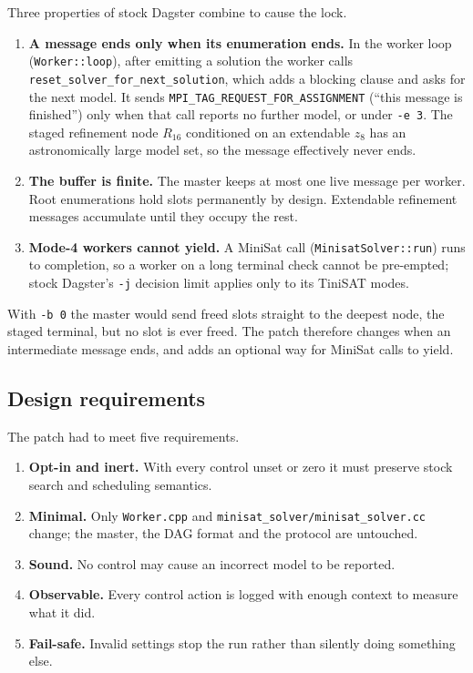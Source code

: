 \documentclass[11pt,a4paper]{article}
\newcommand{\flag}[1]{\texttt{#1}}
\begin{document}
Three properties of stock Dagster combine to cause the lock.
\begin{enumerate}
\item \textbf{A message ends only when its enumeration ends.} In the worker loop
(\texttt{Worker::loop}), after emitting a solution the worker calls
\texttt{reset\_solver\_for\_next\_solution}, which adds a blocking clause and asks for the next model.
It sends \texttt{MPI\_TAG\_REQUEST\_FOR\_ASSIGNMENT} (``this message is finished'') only when that
call reports no further model, or under \flag{-e 3}. The staged refinement node $R_{16}$ conditioned
on an extendable $z_8$ has an astronomically large model set, so the message effectively never ends.
\item \textbf{The buffer is finite.} The master keeps at most one live message per worker. Root
enumerations hold slots permanently by design. Extendable refinement messages accumulate until they
occupy the rest.
\item \textbf{Mode-4 workers cannot yield.} A MiniSat call (\texttt{MinisatSolver::run}) runs to
completion, so a worker on a long terminal check cannot be pre-empted; stock Dagster's \flag{-j}
decision limit applies only to its TiniSAT modes.
\end{enumerate}
With \flag{-b 0} the master would send freed slots straight to the deepest node, the staged terminal,
but no slot is ever freed. The patch therefore changes when an intermediate message ends, and adds an
optional way for MiniSat calls to yield.

\subsection{Design requirements}

The patch had to meet five requirements.
\begin{enumerate}
\item \textbf{Opt-in and inert.} With every control unset or zero it must preserve stock search and
scheduling semantics.
\item \textbf{Minimal.} Only \texttt{Worker.cpp} and \texttt{minisat\_solver/minisat\_solver.cc}
change; the master, the DAG format and the protocol are untouched.
\item \textbf{Sound.} No control may cause an incorrect model to be reported.
\item \textbf{Observable.} Every control action is logged with enough context to measure what it did.
\item \textbf{Fail-safe.} Invalid settings stop the run rather than silently doing something else.
\end{enumerate}
\end{document}

